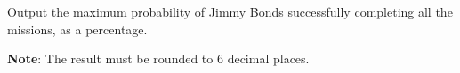 Output the maximum probability of Jimmy Bonds successfully completing all the missions, as a percentage.

\textbf{Note}: The result must be rounded to 6 decimal places.